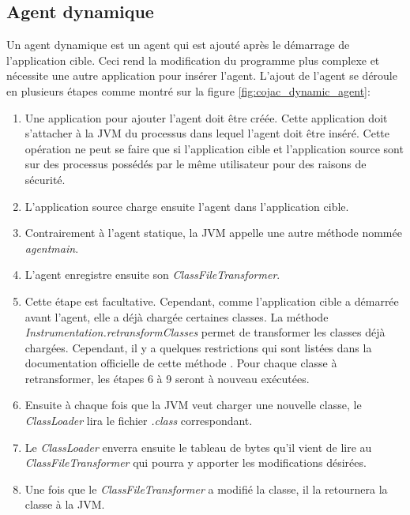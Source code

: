 \subsection{Agent dynamique}

Un agent dynamique est un agent qui est ajouté après le démarrage de l'application cible. Ceci rend la modification du programme plus complexe et nécessite une autre application pour insérer l'agent. L'ajout de l'agent se déroule en plusieurs étapes comme montré sur la figure \ref{fig:cojac_dynamic_agent}:

\begin{enumerate}
    \item Une application pour ajouter l'agent doit être créée. Cette application doit s'attacher à la JVM du processus dans lequel l'agent doit être inséré. Cette opération ne peut se faire que si l'application cible et l'application source sont sur des processus possédés par le même utilisateur pour des raisons de sécurité.
    \item L'application source charge ensuite l'agent dans l'application cible.
    \item Contrairement à l'agent statique, la JVM appelle une autre méthode nommée \textit{agentmain}.
    \item L'agent enregistre ensuite son \textit{ClassFileTransformer}.
    \item Cette étape est facultative. Cependant, comme l'application cible a démarrée avant l'agent, elle a déjà chargée certaines classes. La méthode \textit{Instrumentation.\hspace{0pt}retransformClasses} permet de transformer les classes déjà chargées. Cependant, il y a quelques restrictions qui sont listées dans la documentation officielle de cette méthode \cite{java-instrumentation-retransform-documentation}. Pour chaque classe à retransformer, les étapes 6 à 9 seront à nouveau exécutées.
    \item Ensuite à chaque fois que la JVM veut charger une nouvelle classe, le \textit{ClassLoader} lira le fichier \textit{.class} correspondant.
    \item Le \textit{ClassLoader} enverra ensuite le tableau de bytes qu'il vient de lire au \textit{ClassFileTransformer} qui pourra y apporter les modifications désirées.
    \item Une fois que le \textit{ClassFileTransformer} a modifié la classe, il la retournera la classe à la JVM.
\end{enumerate}

